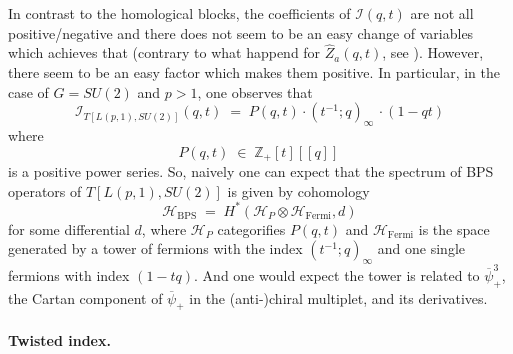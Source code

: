 \documentclass[hyper,letterpaper]{JHEP3}
\newcommand{\Z}{{\mathbb Z}}
\renewcommand{\bar}{\overline}
\renewcommand{\hat}{\widehat}
\def\CH{{\mathcal H}}
\def\CI{{\mathcal I}}
\begin{document}
In contrast to the homological blocks, the coefficients of $\CI(q,t)$ are not all positive/negative and there does not seem to be an easy change of variables which achieves that (contrary to what happend for $\hat{Z}_a(q,t)$, see \cite{Gukov:2016gkn}). However, there seem to be an easy factor which makes them positive. In particular, in the case of $G=SU(2)$ and $p>1$, one observes that
\begin{equation}
	\CI_{T[L(p,1),SU(2)]}(q,t) \; = \; P(q,t) \cdot (t^{-1};q)_\infty\,\cdot (1-qt)
\end{equation}
where
\begin{equation}
	P(q,t) \; \in \; \Z_+[t][[q]] \,
\end{equation}
is a positive power series. So, naively one can expect that the spectrum of BPS operators of $T[L(p,1),SU(2)]$ is given by cohomology
\begin{equation}\label{PositiveFactor}
	\CH_\text{BPS} \; = \; H^*( \CH_{P} \otimes \CH_\text{Fermi} , d)
\end{equation}
for some differential $d$, where $\CH_P$ categorifies $P(q,t)$ and $\CH_\text{Fermi}$ is the space
generated by a tower of fermions with the index $(t^{-1};q)_\infty$ and one single fermions with index $(1-tq)$. And one would expect the tower is related to $\bar{\psi}^3_+$, the Cartan component of $\bar{\psi}_+$ in the (anti-)chiral multiplet, and its derivatives.

\paragraph{Twisted index.}
\end{document}
